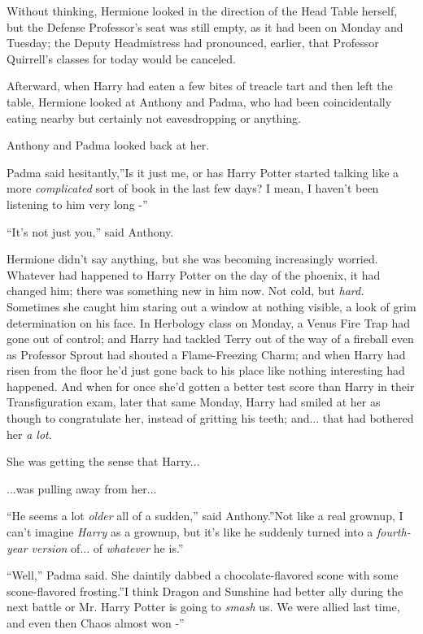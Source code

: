 Without thinking, Hermione looked in the direction of the Head Table
herself, but the Defense Professor's seat was still empty, as it had
been on Monday and Tuesday; the Deputy Headmistress had pronounced,
earlier, that Professor Quirrell's classes for today would be canceled.

Afterward, when Harry had eaten a few bites of treacle tart and then
left the table, Hermione looked at Anthony and Padma, who had been
coincidentally eating nearby but certainly not eavesdropping or
anything.

Anthony and Padma looked back at her.

Padma said hesitantly,''Is it just me, or has Harry Potter started
talking like a more \emph{complicated} sort of book in the last few
days? I mean, I haven't been listening to him very long -''

``It's not just you,'' said Anthony.

Hermione didn't say anything, but she was becoming increasingly worried.
Whatever had happened to Harry Potter on the day of the phoenix, it had
changed him; there was something new in him now. Not cold, but
\emph{hard.} Sometimes she caught him staring out a window at nothing
visible, a look of grim determination on his face. In Herbology class on
Monday, a Venus Fire Trap had gone out of control; and Harry had tackled
Terry out of the way of a fireball even as Professor Sprout had shouted
a Flame-Freezing Charm; and when Harry had risen from the floor he'd
just gone back to his place like nothing interesting had happened. And
when for once she'd gotten a better test score than Harry in their
Transfiguration exam, later that same Monday, Harry had smiled at her as
though to congratulate her, instead of gritting his teeth; and...
that had bothered her \emph{a lot}.

She was getting the sense that Harry...

...was pulling away from her...

``He seems a lot \emph{older} all of a sudden,'' said Anthony.''Not like
a real grownup, I can't imagine \emph{Harry} as a grownup, but it's like
he suddenly turned into a \emph{fourth-year version} of... of
\emph{whatever} he is.''

``Well,'' Padma said. She daintily dabbed a chocolate-flavored scone
with some scone-flavored frosting.''I think Dragon and Sunshine had
better ally during the next battle or Mr. Harry Potter is going to
\emph{smash} us. We were allied last time, and even then Chaos almost
won -''

